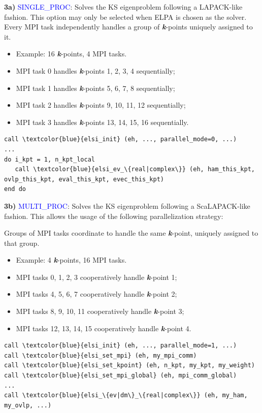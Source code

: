 \documentclass{report}
\begin{document}
\textbf{3a)} \textcolor{blue}{SINGLE\_PROC}: Solves the KS eigenproblem following a LAPACK-like fashion. This option may only be selected when ELPA is chosen as the solver. Every MPI task independently handles a group of \textbf{\textit{k}}-points uniquely assigned to it.
\begin{itemize}
\item Example: 16 \textbf{\textit{k}}-points, 4 MPI tasks.
\item MPI task 0 handles \textbf{\textit{k}}-points 1, 2, 3, 4 sequentially;
\item MPI task 1 handles \textbf{\textit{k}}-points 5, 6, 7, 8 sequentially;
\item MPI task 2 handles \textbf{\textit{k}}-points 9, 10, 11, 12 sequentially;
\item MPI task 3 handles \textbf{\textit{k}}-points 13, 14, 15, 16 sequentially.
\end{itemize}

\begin{tcolorbox}
\begin{Verbatim}[commandchars=\\\{\}]
call \textcolor{blue}{elsi_init} (eh, ..., parallel_mode=0, ...)
...
do i_kpt = 1, n_kpt_local
   call \textcolor{blue}{elsi_ev_\{real|complex\}} (eh, ham_this_kpt, ovlp_this_kpt, eval_this_kpt, evec_this_kpt)
end do
\end{Verbatim}
\end{tcolorbox}

\textbf{3b)} \textcolor{blue}{MULTI\_PROC}: Solves the KS eigenproblem following a ScaLAPACK-like fashion. This allows the usage of the following parallelization strategy:

Groups of MPI tasks coordinate to handle the same \textbf{\textit{k}}-point, uniquely assigned to that group.
\begin{itemize}
\item Example: 4 \textbf{\textit{k}}-points, 16 MPI tasks.
\item MPI tasks 0, 1, 2, 3 cooperatively handle \textbf{\textit{k}}-point 1;
\item MPI tasks 4, 5, 6, 7 cooperatively handle \textbf{\textit{k}}-point 2;
\item MPI tasks 8, 9, 10, 11 cooperatively handle \textbf{\textit{k}}-point 3;
\item MPI tasks 12, 13, 14, 15 cooperatively handle \textbf{\textit{k}}-point 4.
\end{itemize}

\begin{tcolorbox}
\begin{Verbatim}[commandchars=\\\{\}]
call \textcolor{blue}{elsi_init} (eh, ..., parallel_mode=1, ...)
call \textcolor{blue}{elsi_set_mpi} (eh, my_mpi_comm)
call \textcolor{blue}{elsi_set_kpoint} (eh, n_kpt, my_kpt, my_weight)
call \textcolor{blue}{elsi_set_mpi_global} (eh, mpi_comm_global)
...
call \textcolor{blue}{elsi_\{ev|dm\}_\{real|complex\}} (eh, my_ham, my_ovlp, ...)
\end{Verbatim}
\end{tcolorbox}
\end{document}
